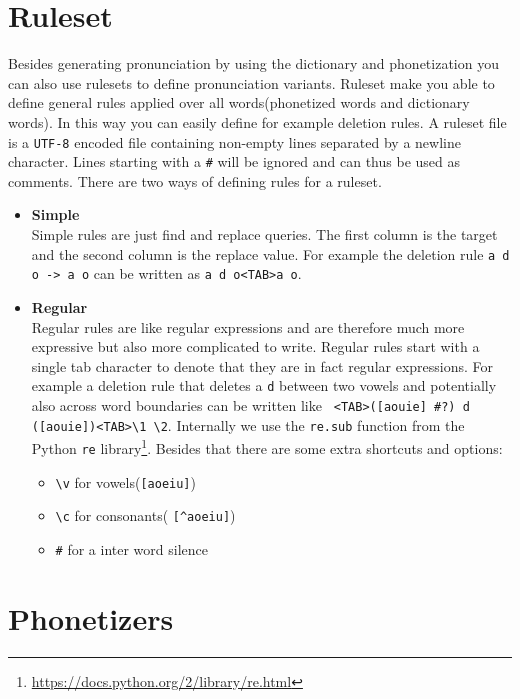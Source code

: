 \section{Ruleset}
Besides generating pronunciation by using the dictionary and phonetization you
can also use rulesets to define pronunciation variants. Ruleset make you able
to define general rules applied over all words(phonetized words and dictionary
words). In this way you can easily define for example deletion rules.
A ruleset file is a \texttt{UTF-8} encoded file containing non-empty lines
separated by a newline character. Lines starting with a \texttt{\#} will be
ignored and can thus be used as comments. There are two ways of defining rules
for a ruleset.
\begin{itemize}
	\item \textbf{Simple}\\
		Simple rules are just find and replace queries. The first column is the
		target and the second column is the replace value. For example the deletion
		rule \texttt{a d o -> a o} can be written as \texttt{a d o<TAB>a o}.
	\item \textbf{Regular}\\
		Regular rules are like regular expressions and are therefore much more
		expressive but also more complicated to write. Regular rules start with a
		single tab character to denote that they are in fact regular expressions.
		For example a deletion rule that deletes a \texttt{d} between two vowels
		and potentially also across word boundaries can be written like \texttt{%
		<TAB>([aouie] \#?) d ([aouie])<TAB>\textbackslash 1 \textbackslash 2}.
		Internally we use the \texttt{re.sub} function from the Python \texttt{re}
		library\footnote{\url{https://docs.python.org/2/library/re.html}}. Besides
		that there are some extra shortcuts and options:
		\begin{itemize}
			\item \texttt{\textbackslash v} for vowels(\texttt{[aoeiu]})
			\item \texttt{\textbackslash c} for consonants(%
				\texttt{[\textasciicircum aoeiu]})
			\item \texttt{\#} for a inter word silence
		\end{itemize}
\end{itemize}


\section{Phonetizers}\label{sec:phonetizers}
